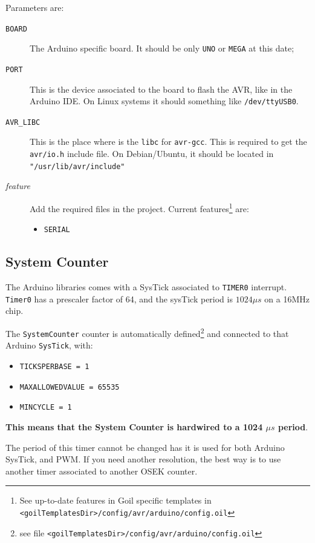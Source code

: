 Parameters are:
\begin{description}
\item[\texttt{BOARD}] The Arduino specific board. It should be only \texttt{UNO} or \texttt{MEGA} at this date;
\item[\texttt{PORT}] This is the device associated to the board to flash the AVR, like in the Arduino IDE. On Linux systems it should something like \texttt{/dev/ttyUSB0}.
\item[\texttt{AVR\_LIBC}] This is the place where is the \texttt{libc} for \texttt{avr-gcc}. This is required to get the \texttt{avr/io.h} include file. On Debian/Ubuntu, it should be located in \texttt{"/usr/lib/avr/include"}
\item[\textit{feature}] Add the required files in the project. Current features\footnote{See up-to-date features in Goil specific templates in \texttt{<goilTemplatesDir>/config/avr/arduino/config.oil}} are:
\begin{itemize}
\item \texttt{SERIAL}
\end{itemize}
\end{description}

\subsection{System Counter}
The Arduino libraries comes with a SysTick associated to \texttt{TIMER0} interrupt. \texttt{Timer0} has a prescaler factor of 64, and the sysTick period is \textbf{$1024\mu s$} on a 16MHz chip.

The \texttt{SystemCounter} counter is automatically defined\footnote{see file \texttt{<goilTemplatesDir>/config/avr/arduino/config.oil}} and connected to that Arduino \texttt{SysTick}, with:
\begin{itemize}
\item \texttt{TICKSPERBASE = 1}
\item \texttt{MAXALLOWEDVALUE = 65535}
\item \texttt{MINCYCLE = 1}
\end{itemize}

\textbf{This means that the System Counter is hardwired to a 1024 $\mu s$ period}.

The period of this timer cannot be changed has it is used for both Arduino SysTick, and PWM. If you need another resolution, the best way is to use another timer associated to another OSEK counter.

